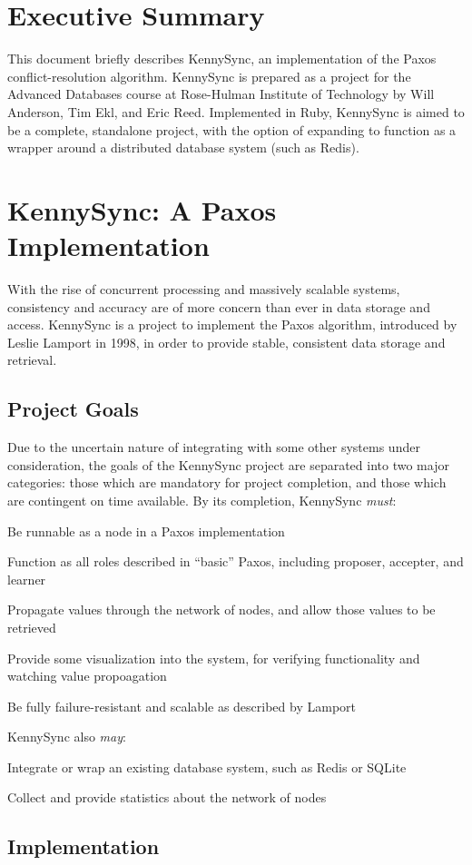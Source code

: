 \documentclass{article}
\begin{document}

\section{Executive Summary}

This document briefly describes KennySync, an implementation of the Paxos conflict-resolution algorithm. KennySync is prepared as a project for the Advanced Databases course at Rose-Hulman Institute of Technology by Will Anderson, Tim Ekl, and Eric Reed. Implemented in Ruby, KennySync is aimed to be a complete, standalone project, with the option of expanding to function as a wrapper around a distributed database system (such as Redis).

\section{KennySync: A Paxos Implementation}

With the rise of concurrent processing and massively scalable systems, consistency and accuracy are of more concern than ever in data storage and access. KennySync is a project to implement the Paxos algorithm, introduced by Leslie Lamport in 1998, in order to provide stable, consistent data storage and retrieval.

\subsection{Project Goals}

Due to the uncertain nature of integrating with some other systems under consideration, the goals of the KennySync project are separated into two major categories: those which are mandatory for project completion, and those which are contingent on time available. By its completion, KennySync \textit{must}:

\begin{itemize*}
\item Be runnable as a node in a Paxos implementation
\item Function as all roles described in ``basic'' Paxos, including proposer, accepter, and learner
\item Propagate values through the network of nodes, and allow those values to be retrieved
\item Provide some visualization into the system, for verifying functionality and watching value propoagation
\item Be fully failure-resistant and scalable as described by Lamport
\end{itemize*}

KennySync also \textit{may}:

\begin{itemize*}
\item Integrate or wrap an existing database system, such as Redis or SQLite
\item Collect and provide statistics about the network of nodes
\end{itemize*}

\subsection{Implementation}
\end{document}

